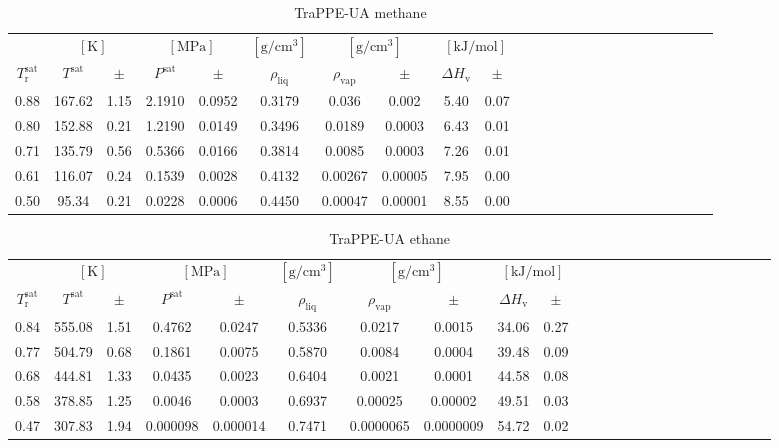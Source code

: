 \documentclass[%
 aip,
 jcp,
 sd,%
 amsmath,amssymb,
]{revtex4-1}
\begin{document}
\begin{table*}[!htbp]
\centering
\caption{
TraPPE-UA methane
}
\label{tab:TraPPE-C1-nistsim}
\begin{ruledtabular}
\begin{tabular}{cccccccccccccccccccccccc}
 & \multicolumn{2}{c}{$[\mathrm{K}]$} &	 \multicolumn{2}{c}{$[\mathrm{MPa}]$} & $[\mathrm{g/cm^3}]$ & \multicolumn{2}{c}{$[\mathrm{g/cm^3}]$} & \multicolumn{2}{c}{$[\mathrm{kJ/mol}]$} \\
$T_\mathrm{r}^{\mathrm{sat}}$ & $T^{\mathrm{sat}}$ & $\pm$ & $P^{\mathrm{sat}}$ & $\pm$ & $\rho_{\mathrm{liq}}$ & $\rho_{\mathrm{vap}}$ & $\pm$ & $\Delta H_{\mathrm{v}}$ & $\pm$
 \\
\hline		
0.88	&	167.62	&	1.15	&	2.1910	&	0.0952	&	0.3179	&	0.036	&	0.002	&	5.40	&	0.07	\\
0.80	&	152.88	&	0.21	&	1.2190	&	0.0149	&	0.3496	&	0.0189	&	0.0003	&	6.43	&	0.01	\\
0.71	&	135.79	&	0.56	&	0.5366	&	0.0166	&	0.3814	&	0.0085	&	0.0003	&	7.26	&	0.01	\\
0.61	&	116.07	&	0.24	&	0.1539	&	0.0028	&	0.4132	&	0.00267	&	0.00005	&	7.95	&	0.00	\\
0.50	&	95.34	&	0.21	&	0.0228	&	0.0006	&	0.4450	&	0.00047	&	0.00001	&	8.55	&	0.00	\\
\end{tabular}
\end{ruledtabular}
\end{table*}


\begin{table*}[]
\centering
\caption{
TraPPE-UA ethane
}
\label{tab:TraPPE-C2-trappe}
\begin{ruledtabular}
\begin{tabular}{cccccccccccccccccccccccc}
 & \multicolumn{2}{c}{$[\mathrm{K}]$} &	 \multicolumn{2}{c}{$[\mathrm{MPa}]$} & $[\mathrm{g/cm^3}]$ & \multicolumn{2}{c}{$[\mathrm{g/cm^3}]$} & \multicolumn{2}{c}{$[\mathrm{kJ/mol}]$} \\
$T_\mathrm{r}^{\mathrm{sat}}$ & $T^{\mathrm{sat}}$ & $\pm$ & $P^{\mathrm{sat}}$ & $\pm$ & $\rho_{\mathrm{liq}}$ & $\rho_{\mathrm{vap}}$ & $\pm$ & $\Delta H_{\mathrm{v}}$ & $\pm$
 \\
\hline		
0.84	&	555.08	&	1.51	&	0.4762	&	0.0247	&	0.5336	&	0.0217	&	0.0015	&	34.06	&	0.27	\\
0.77	&	504.79	&	0.68	&	0.1861	&	0.0075	&	0.5870	&	0.0084	&	0.0004	&	39.48	&	0.09	\\
0.68	&	444.81	&	1.33	&	0.0435	&	0.0023	&	0.6404	&	0.0021	&	0.0001	&	44.58	&	0.08	\\
0.58	&	378.85	&	1.25	&	0.0046	&	0.0003	&	0.6937	&	0.00025	&	0.00002	&	49.51	&	0.03	\\
0.47	&	307.83	&	1.94	&	0.000098	&	0.000014	&	0.7471	&	0.0000065	&	0.0000009	&	54.72	&	0.02	\\
\end{tabular}
\end{ruledtabular}
\end{table*}
\end{document}

